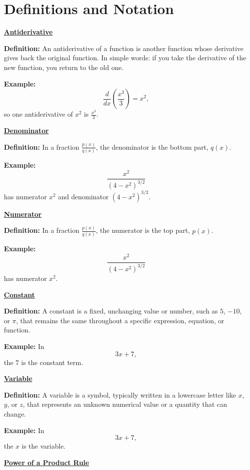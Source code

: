 \documentclass{article}
\newcommand{\defanchor}[1]{\hypertarget{def:#1}{}}
\newcommand{\backtoterm}[2]{\hyperlink{q:#1}{\textbf{#2}}}
\begin{document}
    \newpage
    \section*{Definitions and Notation}

    \defanchor{antiderivative}\backtoterm{antiderivative}{Antiderivative}

    \textbf{Definition:}
    An antiderivative of a function is another function whose derivative gives back the original function.
    In simple words: if you take the derivative of the new function, you return to the old one.

    \textbf{Example:}
    \[
    \frac{d}{dx}\left(\frac{x^3}{3}\right)=x^2,
    \]
    so one antiderivative of $x^2$ is $\frac{x^3}{3}$.

    \defanchor{denominator}\backtoterm{denominator}{Denominator}

    \textbf{Definition:}
    In a fraction $\frac{p(x)}{q(x)}$, the denominator is the bottom part, $q(x)$.

    \textbf{Example:}
    \[
    \frac{x^2}{(4-x^2)^{3/2}}
    \]
    has numerator $x^2$ and denominator $(4-x^2)^{3/2}$.

    \defanchor{numerator}\backtoterm{numerator}{Numerator}

    \textbf{Definition:}
    In a fraction $\frac{p(x)}{q(x)}$, the numerator is the top part, $p(x)$.

    \textbf{Example:}
    \[
    \frac{x^2}{(4-x^2)^{3/2}}
    \]
    has numerator $x^2$.

    \defanchor{constant}\backtoterm{constant}{Constant}

    \textbf{Definition:}
    A constant is a fixed, unchanging value or number, such as $5$, $-10$, or $\pi$, that remains the same throughout a specific expression, equation, or function.

    \textbf{Example:}
    In
    \[
    3x+7,
    \]
    the $7$ is the constant term.

    \defanchor{variable}\backtoterm{variable}{Variable}

    \textbf{Definition:}
    A variable is a symbol, typically written in a lowercase letter like $x$, $y$, or $z$, that represents an unknown numerical value or a quantity that can change.

    \textbf{Example:}
    In
    \[
    3x+7,
    \]
    the $x$ is the variable.

    \defanchor{prod-power}\backtoterm{prod-power}{Power of a Product Rule}
\end{document}
